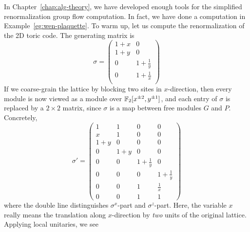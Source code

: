 In Chapter~\ref{chap:alg-theory}, we have developed enough tools for the simplified renormalization group flow computation.
In fact, we have done a computation in Example~\ref{eg:wen-plaquette}.
To warm up, let us compute the renormalization of the 2D toric code.
The generating matrix is
\[
 \sigma =
\begin{pmatrix}
 1+x & 0 \\
 1+y & 0 \\
\hline
\hline
  0  & 1+\frac{1}{y} \\
  0  & 1+\frac{1}{x} \\
\end{pmatrix}
\]
If we coarse-grain the lattice by blocking two sites in $x$-direction,
then every module is now viewed as a module over $\mathbb{F}_2[x^{\pm 2}, y^{\pm 1}]$,
and each entry of $\sigma$ is replaced by a $2 \times 2$ matrix,
since $\sigma$ is a map between free modules $G$ and $P$.
Concretely,
\[
 \sigma' = 
\begin{pmatrix}
 1 & 1 & 0 & 0 \\
 x & 1 & 0 & 0 \\
 1+y & 0 & 0 & 0 \\
 0 & 1+y & 0 & 0 \\
\hline
\hline
 0 & 0 & 1+\frac{1}{y} & 0 \\
 0 & 0 & 0 & 1+\frac{1}{y} \\
 0 & 0 & 1 & \frac{1}{x} \\
 0 & 0 & 1 & 1 
\end{pmatrix}
\]
where the double line distinguishes $\sigma^x$-part and $\sigma^z$-part.
Here, the variable $x$ really means the translation along $x$-direction by \emph{two} units of the original lattice.
Applying local unitaries, we see
